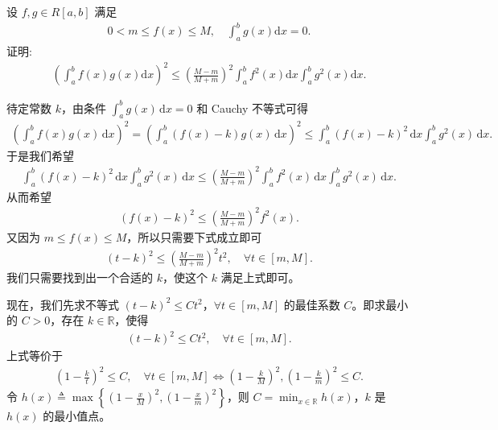 \documentclass[../../main.tex]{subfiles}%
\begin{document}
\begin{example}
设 \(f,g \in R[a,b]\) 满足
\begin{align*}
0 < m \leqslant f(x) \leqslant M, \quad \int_{a}^{b} g(x)\mathrm{d}x = 0.
\end{align*}
证明:
\begin{align*}
\left( \int_a^b{f\left( x \right) g\left( x \right) \mathrm{d}x} \right) ^2\leqslant \left( \frac{M-m}{M+m} \right) ^2\int_a^b{f^2\left( x \right) \mathrm{d}x\int_a^b{g^2\left( x \right) \mathrm{d}x.}}
\end{align*} 
\end{example}
\begin{remark}
待定常数 \(k\)，由条件 \(\int_a^b g(x) \, \mathrm{d}x = 0\) 和 Cauchy 不等式可得
\begin{align*}
\left( \int_a^b f(x) g(x) \, \mathrm{d}x \right)^2 = \left( \int_a^b \left( f(x) - k \right) g(x) \, \mathrm{d}x \right)^2 \leqslant \int_a^b \left( f(x) - k \right)^2 \, \mathrm{d}x \int_a^b g^2(x) \, \mathrm{d}x.
\end{align*}
于是我们希望
\begin{align*}
\int_a^b \left( f(x) - k \right)^2 \, \mathrm{d}x \int_a^b g^2(x) \, \mathrm{d}x \leqslant \left( \frac{M - m}{M + m} \right)^2 \int_a^b f^2(x) \, \mathrm{d}x \int_a^b g^2(x) \, \mathrm{d}x.
\end{align*}
从而希望
\begin{align*}
\left( f(x) - k \right)^2 \leqslant \left( \frac{M - m}{M + m} \right)^2 f^2(x).
\end{align*}
又因为 \(m \leqslant f(x) \leqslant M\)，所以只需要下式成立即可
\begin{align}
\left( t - k \right)^2 \leqslant \left( \frac{M - m}{M + m} \right)^2 t^2, \quad \forall t \in [m, M]. \label{eq:100.5}
\end{align}
我们只需要找到出一个合适的 \(k\)，使这个 \(k\) 满足上式即可。

现在，我们先求不等式 \(\left( t - k \right)^2 \leqslant C t^2\)，\(\forall t \in [m, M]\) 的最佳系数 \(C\)。即求最小的 \(C > 0\)，存在 \(k \in \mathbb{R}\)，使得
\begin{align*}
\left( t - k \right)^2 \leqslant C t^2, \quad \forall t \in [m, M].
\end{align*}
上式等价于
\begin{align*}
\left( 1 - \frac{k}{t} \right)^2 \leqslant C, \quad \forall t \in [m, M] \Longleftrightarrow \left( 1 - \frac{k}{M} \right)^2, \left( 1 - \frac{k}{m} \right)^2 \leqslant C.
\end{align*}
令 \(h(x) \triangleq \max \left\{ \left( 1 - \frac{x}{M} \right)^2, \left( 1 - \frac{x}{m} \right)^2 \right\}\)，则 \(C = \min_{x \in \mathbb{R}} h(x)\)，\(k\) 是 \(h(x)\) 的最小值点。


\end{remark}
\end{document}
